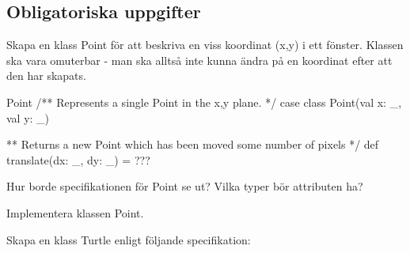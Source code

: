 \subsection{Obligatoriska uppgifter}

\Task Skapa en klass Point för att beskriva en viss koordinat (x,y) i ett fönster. Klassen ska vara omuterbar - man ska alltså inte kunna ändra på en koordinat efter att den har skapats.

\begin{ScalaSpec}{Point}
/** Represents a single Point in the x,y plane. */
case class Point(val x: _, val y: _) {

** Returns a new Point which has been moved some number of pixels */
def translate(dx: _, dy: _) = ???
}
\end{ScalaSpec}

\Subtask Hur borde specifikationen för Point se ut? Vilka typer bör attributen ha?

\Subtask Implementera klassen Point.




\Task Skapa en klass Turtle enligt följande specifikation:

